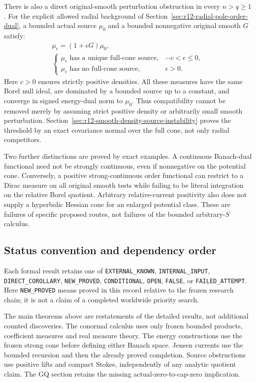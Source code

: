 \documentclass[11pt,a4paper]{article}
\numberwithin{equation}{section}
\theoremstyle{definition}
\theoremstyle{remark}
\begin{document}
There is also a direct original-smooth perturbation obstruction
in every $n>q\geq1$. For the explicit allowed radial background
of Section~\ref{sec:r12-radial-pole-order-dual}, a bounded actual
source $\mu_0$ and a bounded nonnegative original smooth $G$ satisfy:
\[
 \begin{gathered}
 \mu_\epsilon=(1+\epsilon G)\mu_0,\\
 \begin{cases}
  \mu_\epsilon\text{ has a unique full-cone source},&-c<\epsilon\leq0,\\
  \mu_\epsilon\text{ has no full-cone source},&\epsilon>0.
 \end{cases}
 \end{gathered}
 \tag{M22}
\]
Here $c>0$ ensures strictly positive densities. All these measures
have the same Borel null ideal, are dominated by a bounded source
up to a constant, and converge in signed energy-dual norm to
$\mu_0$. Thus compatibility cannot be removed merely by assuming
strict positive density or arbitrarily small smooth perturbation.
Section~\ref{sec:r12-smooth-density-source-instability} proves the
threshold by an exact covariance normal over the full cone, not
only radial competitors.

Two further distinctions are proved by exact examples. A continuous
Banach-dual functional need not be strongly continuous, even if
nonnegative on the potential cone. Conversely, a positive
strong-continuous order functional can restrict to a Dirac measure
on all original smooth tests while failing to be literal integration
on the relative Borel quotient. Arbitrary relative-current positivity
also does not supply a hyperbolic Hessian cone for an enlarged
potential class. These are failures of specific proposed routes,
not failures of the bounded arbitrary-$S$ calculus.

\subsection{Status convention and dependency order}

Each formal result retains one of
\texttt{EXTERNAL\_KNOWN}, \texttt{INTERNAL\_INPUT},
\texttt{DIRECT\_COROLLARY}, \texttt{NEW\_PROVED},
\texttt{CONDITIONAL}, \texttt{OPEN}, \texttt{FALSE},
or \texttt{FAILED\_ATTEMPT}.
Here \texttt{NEW\_PROVED} means proved in this record relative
to the frozen research chain; it is not a claim of a completed
worldwide priority search.

The main theorems above are restatements of the detailed results,
not additional counted discoveries. The conormal calculus uses
only frozen bounded products, coefficient measures and real
measure theory. The energy constructions use the frozen strong
cone before defining either Banach space. Jensen currents use the
bounded recursion and then the already proved completion.
Source obstructions use positive lifts and compact Stokes,
independently of any analytic quotient claim. The GQ section
retains the missing actual-zero-to-cap-zero implication.
\end{document}
